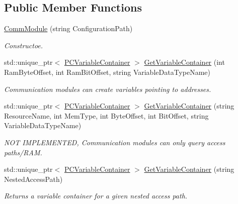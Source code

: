 \subsection*{Public Member Functions}
\begin{DoxyCompactItemize}
\item 
\hyperlink{classpc__emulator_1_1CommModule_abddc1be92ad188b1177a6e32f95a81b2}{Comm\+Module} (string Configuration\+Path)\hypertarget{classpc__emulator_1_1CommModule_abddc1be92ad188b1177a6e32f95a81b2}{}\label{classpc__emulator_1_1CommModule_abddc1be92ad188b1177a6e32f95a81b2}

\begin{DoxyCompactList}\small\item\em Constructoe. \end{DoxyCompactList}\item 
std\+::unique\+\_\+ptr$<$ \hyperlink{classpc__emulator_1_1PCVariableContainer}{P\+C\+Variable\+Container} $>$ \hyperlink{classpc__emulator_1_1CommModule_a674b8ae9e9655c59be67ebd05f66107d}{Get\+Variable\+Container} (int Ram\+Byte\+Offset, int Ram\+Bit\+Offset, string Variable\+Data\+Type\+Name)
\begin{DoxyCompactList}\small\item\em Communication modules can create variables pointing to addresses. \end{DoxyCompactList}\item 
std\+::unique\+\_\+ptr$<$ \hyperlink{classpc__emulator_1_1PCVariableContainer}{P\+C\+Variable\+Container} $>$ \hyperlink{classpc__emulator_1_1CommModule_af99e6d65047aae685e4292814f85c33b}{Get\+Variable\+Container} (string Resource\+Name, int Mem\+Type, int Byte\+Offset, int Bit\+Offset, string Variable\+Data\+Type\+Name)
\begin{DoxyCompactList}\small\item\em N\+OT I\+M\+P\+L\+E\+M\+E\+N\+T\+ED, Communication modules can only query access paths/\+R\+AM. \end{DoxyCompactList}\item 
std\+::unique\+\_\+ptr$<$ \hyperlink{classpc__emulator_1_1PCVariableContainer}{P\+C\+Variable\+Container} $>$ \hyperlink{classpc__emulator_1_1CommModule_a1643e230094b1ffbcaedcfa1de0f8bc8}{Get\+Variable\+Container} (string Nested\+Access\+Path)
\begin{DoxyCompactList}\small\item\em Returns a variable container for a given nested access path. \end{DoxyCompactList}\end{DoxyCompactItemize}
